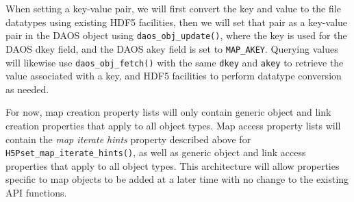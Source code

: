 When setting a key-value pair, we will first convert the key and value to the file datatypes using existing HDF5 facilities, then we will set that pair as a key-value pair in the DAOS object using \verb+daos_obj_update()+, where the key is used for the DAOS dkey field, and the DAOS akey field is set to \verb+MAP_AKEY+. Querying values will likewise use \verb+daos_obj_fetch()+ with the same \verb+dkey+ and \verb+akey+ to retrieve the value associated with a key, and HDF5 facilities to perform datatype conversion as needed.

For now, map creation property lists will only contain generic object and link creation properties that apply to all object types. Map access property lists will contain the \textit{map iterate hints} property described above for \verb+H5Pset_map_iterate_hints()+, as well as generic object and link access properties that apply to all object types. This architecture will allow properties specific to map objects to be added at a later time with no change to the existing API functions.

